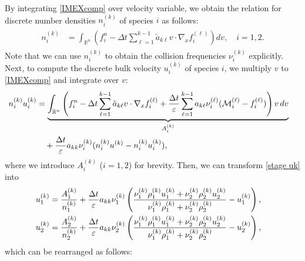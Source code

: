 \documentclass[10pt,reqno]{amsart}
\numberwithin{equation}{section}
\begin{document}
By integrating \eqref{IMEXcomp} 
over velocity variable, we obtain the relation for discrete number densities $n_i^{(k)}$ of species $i$ as follows:
\begin{align}\label{rho k}
	\begin{split}
		n_i^{(k)} &= \int_{\mathbb{R}^{n}}   \left(f_i^{n} - \Delta t\sum_{\ell=1}^{k-1}\tilde{a}_{k\ell} v \cdot \nabla_x f_i^{(\ell)} \right)  dv,\quad i=1,2.
	\end{split}
\end{align}
Note that we can use $n_i^{(k)}$ to obtain the collision frequencies $\nu_i^{(k)}$ explicitly. Next, to compute the discrete bulk velocity $u_i^{(k)}$ of species $i$, we multiply $v$ to \eqref{IMEXcomp} and integrate over $v$:
\begin{align}\label{stage uk}
	\begin{split}
		n_i^{(k)}u_i^{(k)}
		 &= \underbrace{\int_{\mathbb{R}^{n}}   \left(f_i^{n} - \Delta t\sum_{\ell=1}^{k-1}\tilde{a}_{k\ell} v \cdot \nabla_x f_i^{(\ell)}  + \frac{\Delta t}{\varepsilon}\sum_{\ell=1}^{k-1}a_{k\ell}\nu_i^{(\ell)} (\mathcal{M}_i^{(\ell)}-f_i^{(\ell)}) \right) v\,  dv}_{A_i^{(k)}} \cr
		 &\quad + \frac{\Delta t}{\varepsilon}a_{kk}\nu_i^{(k)} (n_i^{(k)}u^{(k)}-n_i^{(k)}u_i^{(k)}),%
	\end{split}
\end{align}
where we introduce $A_i^{(k)}$ ($i=1,2$) for brevity. Then, we can transform \eqref{stage uk} into
\begin{align*}%
	\begin{split}
		u_1^{(k)} 
		&= \frac{A_1^{(k)}}{n_1^{(k)}}+ \frac{\Delta t}{\varepsilon}a_{kk}\nu_1^{(k)} \left(\frac{\nu_1^{(k)}\rho_1^{(k)}u_1^{(k)} + \nu_2^{(k)}\rho_2^{(k)}u_2^{(k)}}{\nu_1^{(k)}\rho_1^{(k)} + \nu_2^{(k)}\rho_2^{(k)}}-u_1^{(k)}\right),\cr
		u_2^{(k)} 
		&= \frac{A_2^{(k)}}{n_2^{(k)}}+ \frac{\Delta t}{\varepsilon}a_{kk}\nu_2^{(k)} \left(\frac{\nu_1^{(k)}\rho_1^{(k)}u_1^{(k)} + \nu_2^{(k)}\rho_2^{(k)}u_2^{(k)}}{\nu_1^{(k)}\rho_1^{(k)} + \nu_2^{(k)}\rho_2^{(k)}}-u_2^{(k)}\right),
	\end{split}
\end{align*}
which can be rearranged as follows:
\end{document}
